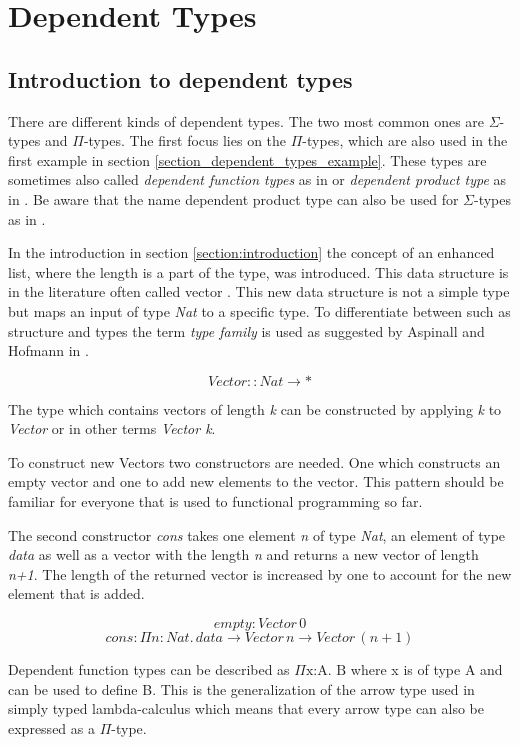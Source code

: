 \section{Dependent Types}\label{section:dependent_types}
\subsection{Introduction to dependent types}
There are different kinds of dependent types. The two most common ones are $\Sigma$-types and $\Pi$-types.
The first focus lies on the $\Pi$-types, which are also used in the first example in section \ref{section_dependent_types_example}. These types are sometimes also called \emph{dependent function types} as in \cite{10.1145/2841316} or \emph{dependent product type} as in \cite{10.5555/1076265}. Be aware that the name dependent product type can also be used for $\Sigma$-types as in \cite{10.1145/2841316}.

In the introduction in section \ref{section:introduction} the concept of an enhanced list, where the length is a part of the type, was introduced.
This data structure is in the literature often called vector \cite{10.1145/2841316} \cite{10.5555/1076265}.
This new data structure is not a simple type but maps an input of type \emph{Nat} to a specific type. To differentiate between such as structure and types the term \emph{type family} is used as suggested by Aspinall and Hofmann in \cite{10.5555/1076265}.

$$Vector :: Nat \rightarrow *$$

The type which contains vectors of length \emph{k} can be constructed by applying \emph{k} to \emph{Vector} or in other terms \emph{Vector k}.

To construct new Vectors two constructors are needed. 
One which constructs an empty vector and one to add new elements to the vector. 
This pattern should be familiar for everyone that is used to functional programming so far.

The second constructor \emph{cons} takes one element \emph{n} of type \emph{Nat}, an element of type \emph{data} as well as a vector with the length \emph{n} and returns a new vector of length \emph{n+1}. 
The length of the returned vector is increased by one to account for the new element that is added.

$$empty: Vector \, 0$$
$$cons : \Pi n : Nat. \, data \rightarrow Vector \, n \rightarrow Vector \, (n+1)$$

Dependent function types can be described as $\Pi \text{x:A. B}$ where x is of type A and can be used to define B. 
This is the generalization of the arrow type used in simply typed lambda-calculus which means that every arrow type can also be expressed as a $\Pi$-type.

